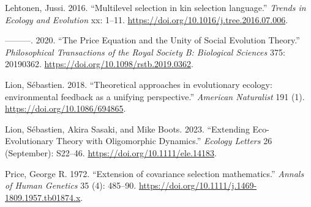 \documentclass[
]{article}
\newlength{\cslhangindent}
\newenvironment{CSLReferences}[2] %
 {\begin{list}{}{%
  \setlength{\itemindent}{0pt}
  \setlength{\leftmargin}{0pt}
  \setlength{\parsep}{0pt}
  \ifodd #1
   \setlength{\leftmargin}{\cslhangindent}
   \setlength{\itemindent}{-1\cslhangindent}
  \fi
  \setlength{\itemsep}{#2\baselineskip}}}
 {\end{list}}
\begin{document}
\label{refs}
\begin{CSLReferences}{1}{0}
Lehtonen, Jussi. 2016. {``{Multilevel selection in kin selection
language}.''} \emph{Trends in Ecology and Evolution} xx: 1--11.
\url{https://doi.org/10.1016/j.tree.2016.07.006}.

---------. 2020. {``The Price Equation and the Unity of Social Evolution
Theory.''} \emph{Philosophical Transactions of the Royal Society B:
Biological Sciences} 375: 20190362.
\url{https://doi.org/10.1098/rstb.2019.0362}.

Lion, Sébastien. 2018. {``{Theoretical approaches in evolutionary
ecology: environmental feedback as a unifying perspective}.''}
\emph{American Naturalist} 191 (1).
\url{https://doi.org/10.1086/694865}.

Lion, Sébastien, Akira Sasaki, and Mike Boots. 2023. {``Extending
Eco-Evolutionary Theory with Oligomorphic Dynamics.''} \emph{Ecology
Letters} 26 (September): S22--46.
\url{https://doi.org/10.1111/ele.14183}.

Price, George R. 1972. {``{Extension of covariance selection
mathematics}.''} \emph{Annals of Human Genetics} 35 (4): 485--90.
\url{https://doi.org/10.1111/j.1469-1809.1957.tb01874.x}.

\end{CSLReferences}
\end{document}
